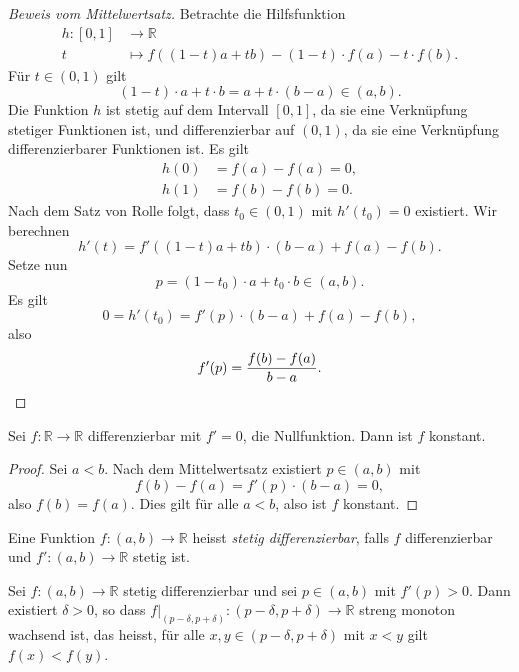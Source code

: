 \documentclass[../main.tex]{subfiles}
\begin{document}
\begin{proof}[Beweis vom Mittelwertsatz]
  Betrachte die Hilfsfunktion 
  \begin{align*}
    h \colon [0, 1] & \to \mathbb{R} \\
    t & \mapsto f((1- t)a + tb) - (1-t) \cdot f(a) - t\cdot f(b).
  \end{align*}
  Für $t \in (0, 1)$ gilt
  \[
    (1- t) \cdot a + t \cdot b = a + t \cdot (b-a) \in (a, b).
  \]
  Die Funktion $h$ ist stetig auf dem Intervall $[0, 1]$,
  da sie eine Verknüpfung stetiger Funktionen ist,
  und differenzierbar auf $(0, 1)$, da sie eine Verknüpfung
  differenzierbarer Funktionen ist.
  Es gilt
  \begin{align*}
    h(0) &= f(a) - f(a) = 0,\\
    h(1) & = f(b) - f(b) = 0.
  \end{align*}
  Nach dem Satz von Rolle folgt, dass
  $t_0 \in (0, 1)$ mit $h'(t_0) = 0$ 
  existiert.
  Wir berechnen \[
    h'(t)  = f'((1-t)a + tb) \cdot (b-a) 
  + f(a) - f(b). \]
  Setze nun
  \[
    p = (1- t_0) \cdot a + t_0 \cdot b \in (a, b).
  \]
  Es gilt
  \[
    0 = h'(t_0) = f'(p) \cdot (b-a) + f(a) - f(b),
  \]
  also
  \[
    f'(p) = \frac{f(b) - f(a)}{b-a}. \qedhere
  \]
\end{proof}

\begin{corollary}
  Sei $f \colon \mathbb{R} \to \mathbb{R}$ differenzierbar
  mit $f' = 0$, die Nullfunktion.
  Dann ist $f$ konstant.
\end{corollary}

\begin{proof}
  Sei $a < b$. Nach dem Mittelwertsatz
  existiert $p \in (a, b)$ mit
  \[
    f(b) - f(a) = f'(p) \cdot (b-a) = 0,
  \]
  also $f(b) = f(a)$.
  Dies gilt für alle $a < b$, also
  ist $f$ konstant.
\end{proof}

\begin{definition}
  Eine Funktion $f \colon (a, b) \to \mathbb{R}$ 
  heisst \emph{stetig differenzierbar}, falls
  $f$ differenzierbar und $f' \colon (a, b) \to \mathbb{R}$ 
  stetig ist.
\end{definition}


\begin{corollary}\label{cor:strictly-monotone}
  Sei $f \colon (a, b) \to \mathbb{R}$ 
  stetig differenzierbar und sei
  $p \in (a, b)$ mit $f'(p) > 0$.
  Dann existiert $\delta > 0$,
  so dass $f|_{(p- \delta, p + \delta)}
  \colon (p - \delta, p + \delta) \to \mathbb{R}$ 
  streng monoton wachsend ist,
  das heisst, für alle $x, y \in (p - \delta, p + \delta)$ 
  mit $x < y$ gilt
  $f(x) < f(y)$.
\end{corollary}
\end{document}
